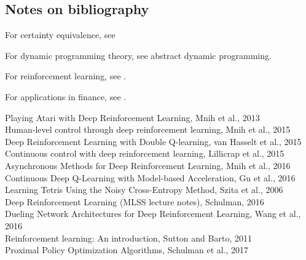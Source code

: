 \begin{refsection}
\section{Notes on bibliography}


For certainty equivalence, see \cite[160]{bertsekas2012dynamic}

For dynamic programming theory, see abstract dynamic programming.

For reinforcement learning, see \cite{wiering2012reinforcement}.

For applications in finance, see \cite{chang2004stochastic}\cite{pham2009continuous}\cite{bertsekas2012dynamic}.

Playing Atari with Deep Reinforcement Learning, Mnih et al., 2013 \\
Human-level control through deep reinforcement learning, Mnih et al., 2015 \\
Deep Reinforcement Learning with Double Q-learning, van Hasselt et al., 2015 \\
Continuous control with deep reinforcement learning, Lillicrap et al., 2015 \\
Asynchronous Methods for Deep Reinforcement Learning, Mnih et al., 2016 \\
Continuous Deep Q-Learning with Model-based Acceleration, Gu et al., 2016 \\
Learning Tetris Using the Noisy Cross-Entropy Method, Szita et al., 2006 \\
Deep Reinforcement Learning (MLSS lecture notes), Schulman, 2016 \\
Dueling Network Architectures for Deep Reinforcement Learning, Wang et al., 2016 \\
Reinforcement learning: An introduction, Sutton and Barto, 2011 \\
Proximal Policy Optimization Algorithms, Schulman et al., 2017 \\
\printbibliography

\end{refsection}